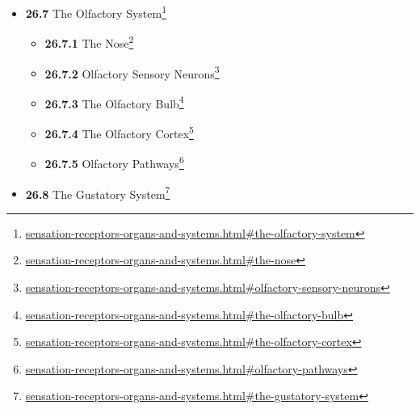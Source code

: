 \documentclass[
]{article}
\providecommand{\tightlist}{%
  \setlength{\itemsep}{0pt}\setlength{\parskip}{0pt}}
\providecommand{\tightlist}{%
  \setlength{\itemsep}{0pt}\setlength{\parskip}{0pt}}
\let\rmarkdownfootnote\footnote%
\def\footnote{\protect\rmarkdownfootnote}
\renewcommand{\href}[2]{#2\footnote{\url{#1}}}
\theoremstyle{definition}
\theoremstyle{definition}
\theoremstyle{definition}
\theoremstyle{remark}
\begin{document}
\begin{itemize}
\begin{itemize}
    \begin{itemize}
    \tightlist
    \item
      \href{sensation-receptors-organs-and-systems.html\#touch}{\emph{}\textbf{26.6.1}
      Touch}
    \item
      \href{sensation-receptors-organs-and-systems.html\#cutaneous-mechanoreceptors}{\emph{}\textbf{26.6.2}
      Cutaneous Mechanoreceptors}
    \item
      \href{sensation-receptors-organs-and-systems.html\#nociception}{\emph{}\textbf{26.6.3}
      Nociception}
    \item
      \href{sensation-receptors-organs-and-systems.html\#proprioception}{\emph{}\textbf{26.6.4}
      Proprioception}
    \item
      \href{sensation-receptors-organs-and-systems.html\#muscle-spindles}{\emph{}\textbf{26.6.5}
      Muscle Spindles}
    \item
      \href{sensation-receptors-organs-and-systems.html\#golgi-tendon-organ}{\emph{}\textbf{26.6.6}
      Golgi Tendon Organ}
    \item
      \href{sensation-receptors-organs-and-systems.html\#the-somatosensory-pathways}{\emph{}\textbf{26.6.7}
      The Somatosensory Pathways}
    \item
      \href{sensation-receptors-organs-and-systems.html\#the-primary-somatosensory-cortex}{\emph{}\textbf{26.6.8}
      The Primary Somatosensory Cortex}
    \end{itemize}
  \item
    \href{sensation-receptors-organs-and-systems.html\#the-olfactory-system}{\emph{}\textbf{26.7}
    The Olfactory System}

    \begin{itemize}
    \tightlist
    \item
      \href{sensation-receptors-organs-and-systems.html\#the-nose}{\emph{}\textbf{26.7.1}
      The Nose}
    \item
      \href{sensation-receptors-organs-and-systems.html\#olfactory-sensory-neurons}{\emph{}\textbf{26.7.2}
      Olfactory Sensory Neurons}
    \item
      \href{sensation-receptors-organs-and-systems.html\#the-olfactory-bulb}{\emph{}\textbf{26.7.3}
      The Olfactory Bulb}
    \item
      \href{sensation-receptors-organs-and-systems.html\#the-olfactory-cortex}{\emph{}\textbf{26.7.4}
      The Olfactory Cortex}
    \item
      \href{sensation-receptors-organs-and-systems.html\#olfactory-pathways}{\emph{}\textbf{26.7.5}
      Olfactory Pathways}
    \end{itemize}
  \item
    \href{sensation-receptors-organs-and-systems.html\#the-gustatory-system}{\emph{}\textbf{26.8}
    The Gustatory System}


\end{itemize}
\end{itemize}
\end{document}
